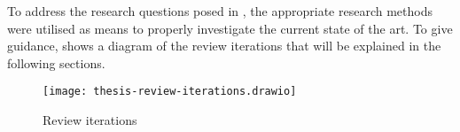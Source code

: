 To address the research questions posed in , the
appropriate research methods were utilised as means to properly investigate the
current state of the art. To give guidance,
 shows a diagram of the review iterations that will
be explained in the following sections.

\begin{figure*}[!htb]
  \caption{Review iterations}
  \label{fig:review-iterations}
  \centering
  \texttt{[image: thesis-review-iterations.drawio]}
\end{figure*}
